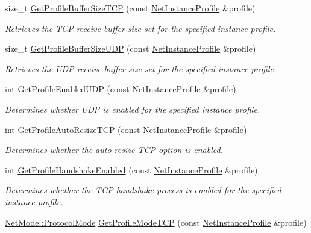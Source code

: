 \begin{DoxyCompactItemize}
size\_\-t \hyperlink{namespacemn_a48fb0065708925bdfbaf6417fb8cf5ba}{GetProfileBufferSizeTCP} (const \hyperlink{class_net_instance_profile}{NetInstanceProfile} \&profile)
\begin{DoxyCompactList}\small\item\em Retrieves the TCP receive buffer size set for the specified instance profile. \item\end{DoxyCompactList}\item 
size\_\-t \hyperlink{namespacemn_abd94f490a1309bd014054ccec0a0ec37}{GetProfileBufferSizeUDP} (const \hyperlink{class_net_instance_profile}{NetInstanceProfile} \&profile)
\begin{DoxyCompactList}\small\item\em Retrieves the UDP receive buffer size set for the specified instance profile. \item\end{DoxyCompactList}\item 
int \hyperlink{namespacemn_a1e4a81f4292c441f96a3c4570ad478f4}{GetProfileEnabledUDP} (const \hyperlink{class_net_instance_profile}{NetInstanceProfile} \&profile)
\begin{DoxyCompactList}\small\item\em Determines whether UDP is enabled for the specified instance profile. \item\end{DoxyCompactList}\item 
int \hyperlink{namespacemn_ac03adfd09e27f61434b7a596ac09ac04}{GetProfileAutoResizeTCP} (const \hyperlink{class_net_instance_profile}{NetInstanceProfile} \&profile)
\begin{DoxyCompactList}\small\item\em Determines whether the auto resize TCP option is enabled. \item\end{DoxyCompactList}\item 
int \hyperlink{namespacemn_ab3988fac0c174c504420effad77d4060}{GetProfileHandshakeEnabled} (const \hyperlink{class_net_instance_profile}{NetInstanceProfile} \&profile)
\begin{DoxyCompactList}\small\item\em Determines whether the TCP handshake process is enabled for the specified instance profile. \item\end{DoxyCompactList}\item 
\hyperlink{class_net_mode_a43cfa55ee6a4db66a8d7d6c27f766964}{NetMode::ProtocolMode} \hyperlink{namespacemn_a9d39472596d65f39e019a1ca459c17c6}{GetProfileModeTCP} (const \hyperlink{class_net_instance_profile}{NetInstanceProfile} \&profile)

\end{DoxyCompactItemize}
